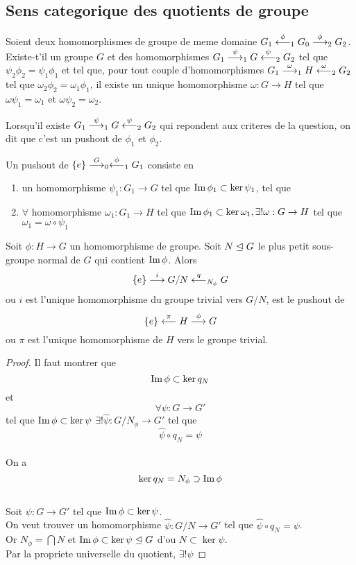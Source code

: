 \documentclass[../main.tex]{subfiles}
\begin{document}
\subsection{Sens categorique des quotients de groupe}
Soient deux homomorphismes de groupe de meme domaine $G_1 \overset{\phi}{\longleftarrow}_1 G_0 \overset{\phi}{\longrightarrow}_2 G_2$.\\
Existe-t'il un groupe $G$ et des homomorphismes $G_1 \overset{\psi}{\longrightarrow}_1 G \overset{\psi}{\longleftarrow}_2 G_2$ tel que $\psi_2\phi_2= \psi_1\phi_1$ et tel que, pour tout couple d'homomorphismes $ G_1 \overset{\omega}{\longrightarrow}_1 H \overset{\omega}{\longleftarrow}_2 G_2$ tel que $\omega_2\phi_2=\omega_1\phi_1$, il existe un unique homomorphisme $\omega: G \to H$ tel que
$\omega\psi_1=\omega_1$ et $\omega\psi_2= \omega_2$.\\
\begin{rmq}
Lorsqu'il existe $ G_1 \overset{\psi}{\longrightarrow}_1 G \overset{\psi}{\longleftarrow}_2 G_2$ qui repondent aux criteres de la question, on dit que c'est un pushout de $\phi_1$ et $\phi_2$. 
\end{rmq}
Un pushout de $ \left\{ e   \right\} \overset{G}{\longrightarrow}_0 \overset{\phi}{\longleftarrow}_1 G_1$ consiste en 
\begin{enumerate}
\item un homomorphisme $\psi_1: G_1\to G$ tel que $\operatorname{Im} \phi_1 \subset \ker\psi_1$, tel que
\item $\forall$ homomorphisme $\omega_1: G_1\to H$ tel que $\operatorname{Im} \phi_1 \subset \ker \omega_1, \exists! \omega: G\to H$ tel que $\omega_1=\omega\circ \psi_1$ 
\end{enumerate}
\begin{propo}
Soit $\phi: H \to G$ un homomorphisme de groupe. Soit $N \trianglelefteq G$ le plus petit sous-groupe normal de $G$ qui contient $\operatorname{Im} \phi$. Alors
\[ 
\left\{ e   \right\} \overset{i}{\longrightarrow} G/N \overset{q}{\longleftarrow}_{N_\phi} G
\]
ou $i$ est l'unique homomorphisme du groupe trivial vers $ G /N$, est le pushout de
\[ 
\left\{ e   \right\} \overset{\pi}{\longleftarrow} H \overset{\phi}{\longrightarrow} G
\]
ou $\pi$ est l'unique homomorphisme de $H$ vers le groupe trivial.
\end{propo}
\begin{proof}
Il faut montrer que
\[ 
\operatorname{Im}\phi \subset \ker q_{N} 
\]
et
\[ 
\forall \psi: G\to G'
\]
tel que $\operatorname{Im}\phi \subset \ker\psi$ $\exists! \hat{\psi}: G /N_\phi\to G'$ tel que
\[ 
\hat{\psi}\circ q_N = \psi
\]
\hr\\
On a 
\[ 
\ker q_N = N_\phi \supset \operatorname{Im}\phi
\]
\hr\\
Soit $\psi: G \to G'$ tel que $\operatorname{Im}\phi \subset \ker\psi$.\\
On veut trouver un homomorphisme $ \hat{\psi}: G /N \to G'$ tel que $ \hat{\psi}\circ q_N=\psi$.\\
Or $N_\phi = \bigcap N$ et $\operatorname{Im} \phi \subset \ker\psi \trianglelefteq G$ d'ou $N \subset \ker\psi$.\\
Par la propriete universelle du quotient, $\exists! \hat{\psi}$ 
\end{proof}



	
\end{document}
